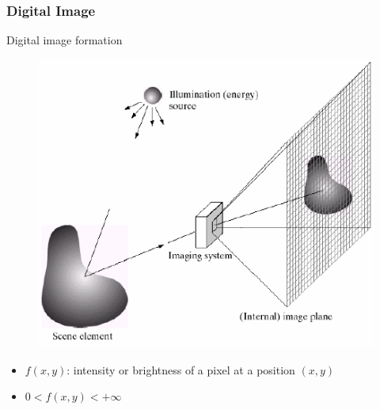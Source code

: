 \documentclass[table]{beamer}
\begin{document}
\begin{frame}
  \frametitle{Digital Image}
    \begin{block}{Digital image formation}
        \begin{figure}
        \centering
        \includegraphics[height=.4\textheight]{./images/img_form.png}
      \end{figure}
      \begin{itemize}\scriptsize
        \item $f(x,y)$: intensity or brightness of a pixel at a position $(x,y)$
        \item $0 < f(x,y) < +\infty$
      \end{itemize}
    \end{block}
\end{frame}
\end{document}
